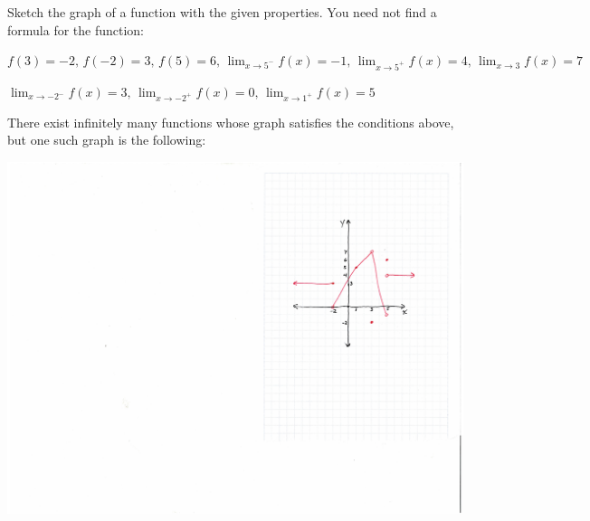 \documentclass[handout,nooutcomes]{ximera}
\begin{document}
	
\begin{problem}
Sketch the graph of a function with the given properties.  You need not find a formula for the function:
	
	$ f(3) = -2, \, f(-2) = 3, \, f(5) = 6, \, \lim_{x \to 5^-} f(x) = -1, \, \lim_{x \to 5^+} f(x) = 4, \, \lim_{x \to 3} f(x) = 7  $
	
	$ \lim_{x \to -2^-} f(x) = 3, \, \lim_{x \to -2^+} f(x) = 0, \, \lim_{x \to 1^+} f(x) = 5  $
	
	\begin{freeResponse}
	There exist infinitely many functions whose graph satisfies the conditions above, but one such graph is the following:
	
\newpage
	
		\begin{image}
		\includegraphics[trim= 450 620 10 0]{Figure3.pdf}
		\end{image}
	\end{freeResponse}
\end{problem}
	










								
				
				
	
\end{document}
